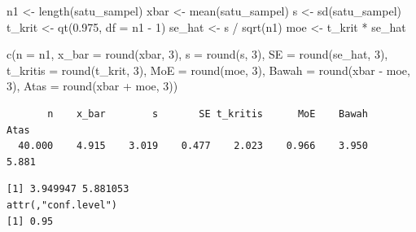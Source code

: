 \documentclass[
  indonesian,
  letterpaper,
]{book}
\newenvironment{Shaded}{\begin{snugshade}}{\end{snugshade}}
\newcommand{\AttributeTok}[1]{\textcolor[rgb]{0.40,0.45,0.13}{#1}}
\newcommand{\CommentTok}[1]{\textcolor[rgb]{0.37,0.37,0.37}{#1}}
\newcommand{\DecValTok}[1]{\textcolor[rgb]{0.68,0.00,0.00}{#1}}
\newcommand{\FloatTok}[1]{\textcolor[rgb]{0.68,0.00,0.00}{#1}}
\newcommand{\FunctionTok}[1]{\textcolor[rgb]{0.28,0.35,0.67}{#1}}
\newcommand{\NormalTok}[1]{\textcolor[rgb]{0.00,0.23,0.31}{#1}}
\newcommand{\OtherTok}[1]{\textcolor[rgb]{0.00,0.23,0.31}{#1}}
\newcommand{\SpecialCharTok}[1]{\textcolor[rgb]{0.37,0.37,0.37}{#1}}
\begin{document}
\begin{Shaded}
\begin{Highlighting}[]
\NormalTok{n1     }\OtherTok{\textless{}{-}} \FunctionTok{length}\NormalTok{(satu\_sampel)}
\NormalTok{xbar   }\OtherTok{\textless{}{-}} \FunctionTok{mean}\NormalTok{(satu\_sampel)}
\NormalTok{s      }\OtherTok{\textless{}{-}} \FunctionTok{sd}\NormalTok{(satu\_sampel)}
\NormalTok{t\_krit }\OtherTok{\textless{}{-}} \FunctionTok{qt}\NormalTok{(}\FloatTok{0.975}\NormalTok{, }\AttributeTok{df =}\NormalTok{ n1 }\SpecialCharTok{{-}} \DecValTok{1}\NormalTok{)}
\NormalTok{se\_hat }\OtherTok{\textless{}{-}}\NormalTok{ s }\SpecialCharTok{/} \FunctionTok{sqrt}\NormalTok{(n1)}
\NormalTok{moe    }\OtherTok{\textless{}{-}}\NormalTok{ t\_krit }\SpecialCharTok{*}\NormalTok{ se\_hat}

\FunctionTok{c}\NormalTok{(}\AttributeTok{n =}\NormalTok{ n1, }\AttributeTok{x\_bar =} \FunctionTok{round}\NormalTok{(xbar, }\DecValTok{3}\NormalTok{), }\AttributeTok{s =} \FunctionTok{round}\NormalTok{(s, }\DecValTok{3}\NormalTok{), }\AttributeTok{SE =} \FunctionTok{round}\NormalTok{(se\_hat, }\DecValTok{3}\NormalTok{),}
  \AttributeTok{t\_kritis =} \FunctionTok{round}\NormalTok{(t\_krit, }\DecValTok{3}\NormalTok{), }\AttributeTok{MoE =} \FunctionTok{round}\NormalTok{(moe, }\DecValTok{3}\NormalTok{),}
  \AttributeTok{Bawah =} \FunctionTok{round}\NormalTok{(xbar }\SpecialCharTok{{-}}\NormalTok{ moe, }\DecValTok{3}\NormalTok{), }\AttributeTok{Atas =} \FunctionTok{round}\NormalTok{(xbar }\SpecialCharTok{+}\NormalTok{ moe, }\DecValTok{3}\NormalTok{))}
\end{Highlighting}
\end{Shaded}

\begin{verbatim}
       n    x_bar        s       SE t_kritis      MoE    Bawah     Atas 
  40.000    4.915    3.019    0.477    2.023    0.966    3.950    5.881 
\end{verbatim}

\begin{Shaded}
\end{Shaded}

\begin{verbatim}
[1] 3.949947 5.881053
attr(,"conf.level")
[1] 0.95
\end{verbatim}
\end{document}
